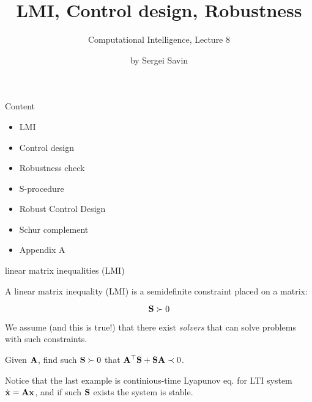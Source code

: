 \documentclass{beamer}
\title{LMI, Control design, Robustness}
\subtitle{Computational Intelligence, Lecture 8}
\author{by Sergei Savin}
\date{\mydate}
\begin{document}
\maketitle


\begin{frame}{Content}
	
	\begin{itemize}
		\item LMI
		\item Control design
		\item Robustness check
		\item S-procedure
		\item Robust Control Design
		\item Schur complement
		\item Appendix A
	\end{itemize}
	
	
\end{frame}




\begin{frame}{linear matrix inequalities (LMI)}
	\begin{flushleft}
		
		A linear matrix inequality (LMI) is a semidefinite constraint placed on a matrix:
		
		\begin{equation}
			\mathbf{S} \succ 0
		\end{equation}
		
		We assume (and this is true!) that there exist \emph{solvers} that can solve problems with such constraints. 
		
		
		\begin{example}
			Given $\mathbf{A}$, find such $\mathbf{S}\succ 0$ that $\mathbf{A}^\top\mathbf{S} + \mathbf{S}\mathbf{A} \prec 0$.
		\end{example}
		
		Notice that the last example is continious-time Lyapunov eq. for LTI system $\dot{\mathbf{x}} = \mathbf{A}\mathbf{x}$, and if such $\mathbf{S}$ exists the system is stable. 
		
	\end{flushleft}
\end{frame}
\end{document}
